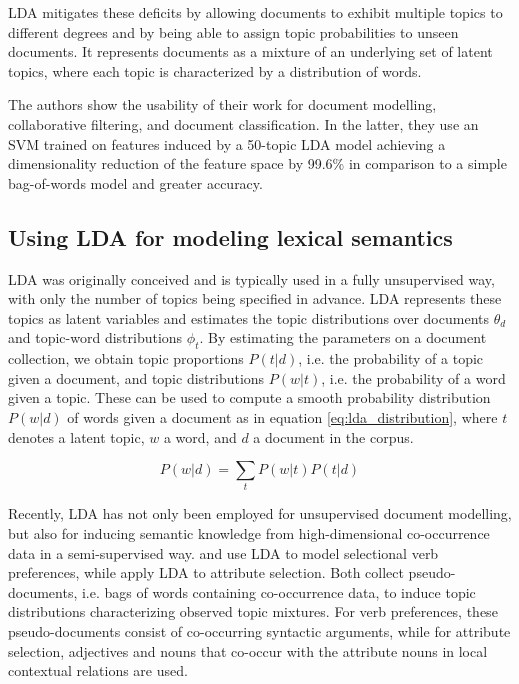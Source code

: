 LDA mitigates these deficits by allowing documents to exhibit multiple topics to different degrees and by being able to assign topic probabilities to unseen documents. It represents documents as a mixture of an underlying set of latent topics, where each topic is characterized by a distribution of words.

The authors show the usability of their work for document modelling, collaborative filtering, and document classification. In the latter, they use an SVM trained on features induced by a 50-topic LDA model achieving a dimensionality reduction of the feature space 
by 99.6\% in comparison to a simple bag-of-words model and greater accuracy.

\subsection{Using LDA for modeling lexical semantics}

LDA was originally conceived and is typically used in a fully unsupervised way, with only the number of topics being specified in advance. LDA represents these topics as latent variables and estimates the topic distributions over documents $\theta_d$ and topic-word distributions $\phi_t$. By estimating the parameters on a document collection, we obtain topic proportions $P(t|d)$, i.e. the probability of a topic given a document, and topic distributions $P(w|t)$, i.e. the probability of a word given a topic. These can be used to compute a smooth probability distribution $P(w|d)$ of words given a document as in equation \ref{eq:lda_distribution}, where $t$ denotes a latent topic, $w$ a word, and $d$ a document in the corpus.

\begin{equation} \label{eq:lda_distribution}
P(w|d) = \sum_t P(w|t) P(t|d)
\end{equation}

Recently, LDA has not only been employed for unsupervised document modelling, but also for inducing semantic knowledge from high-dimensional co-occurrence data in a semi-supervised way. \citeauthor{lda_cite1} and \citeauthor{lda_cite2} use LDA to model selectional verb preferences, while \citeauthor{supervised_lda} apply LDA to attribute selection. Both collect pseudo-documents, i.e. bags of words containing co-occurrence data, to induce topic distributions characterizing observed topic mixtures. For verb preferences, these pseudo-documents consist of co-occurring syntactic arguments, while for attribute selection, adjectives and nouns that co-occur with the attribute nouns in local contextual relations are used.

